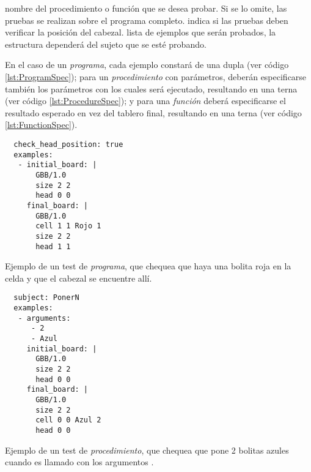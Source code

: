 \begin{itemize}
   nombre del procedimiento o función que se desea probar. Si se lo omite, las pruebas se realizan sobre el programa completo.
   indica si las pruebas deben verificar la posición del cabezal.
   lista de ejemplos que serán probados, la estructura dependerá del sujeto que se esté probando.

  En el caso de un \emph{programa}, cada ejemplo constará de una dupla  (ver código \ref{lst:ProgramSpec}); para un \emph{procedimiento} con parámetros, deberán especificarse también los parámetros con los cuales será ejecutado, resultando en una terna  (ver código \ref{lst:ProcedureSpec}); y para una \emph{función} deberá especificarse el resultado esperado en vez del tablero final, resultando en una terna  (ver código \ref{lst:FunctionSpec}).
\end{itemize}

\begin{listing}
  \centering

  \begin{verbatim}
  check_head_position: true
  examples:
   - initial_board: |
       GBB/1.0
       size 2 2
       head 0 0
     final_board: |
       GBB/1.0
       cell 1 1 Rojo 1
       size 2 2
       head 1 1
  \end{verbatim}

  \caption{Ejemplo de un test de \emph{programa}, que chequea que haya una bolita roja en la celda  y que el cabezal se encuentre allí.}
  \label{lst:ProgramSpec}
\end{listing}

\begin{listing}
  \centering

  \begin{verbatim}
  subject: PonerN
  examples:
   - arguments:
      - 2
      - Azul
     initial_board: |
       GBB/1.0
       size 2 2
       head 0 0
     final_board: |
       GBB/1.0
       size 2 2
       cell 0 0 Azul 2
       head 0 0
  \end{verbatim}

  \caption{Ejemplo de un test de \emph{procedimiento}, que chequea que  pone 2 bolitas azules cuando es llamado con los argumentos .}
  \label{lst:ProcedureSpec}
\end{listing}

